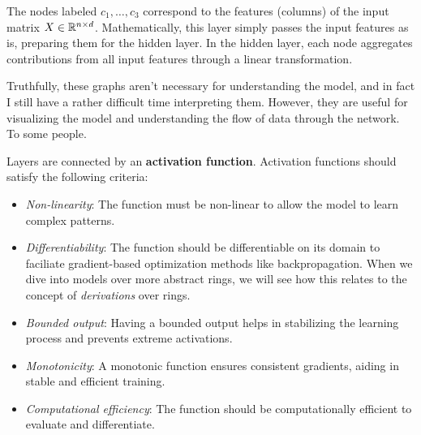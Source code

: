 
The nodes labeled $c_1, \ldots, c_3$ correspond to the features (columns) of the input matrix $X\in \mathbb{R}^{n\times d}$. Mathematically, this layer simply passes the input features as is, preparing them for the hidden layer. In the hidden layer, each node aggregates contributions from all input features through a linear transformation. 

Truthfully, these graphs aren't necessary for understanding the model, and in fact I still have a rather difficult time interpreting them. However, they are useful for visualizing the model and understanding the flow of data through the network. To some people. 

Layers are connected by an \textbf{activation function}. Activation functions should satisfy the following criteria:
\begin{itemize}
    \item \emph{Non-linearity}: The function must be non-linear to allow the model to learn complex patterns.
    \item \emph{Differentiability}: The function should be differentiable on its domain to faciliate gradient-based optimization methods like backpropagation. When we dive into models over more abstract rings, we will see how this relates to the concept of \emph{derivations} over rings.
    \item \emph{Bounded output}: Having a bounded output helps in stabilizing the learning process and prevents extreme activations.
    \item \emph{Monotonicity}: A monotonic function ensures consistent gradients, aiding in stable and efficient training.
    \item \emph{Computational efficiency}: The function should be computationally efficient to evaluate and differentiate.
\end{itemize}

